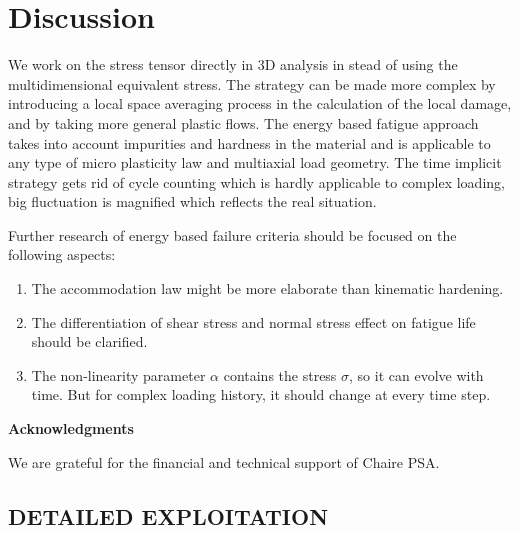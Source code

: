 \documentclass[3p,times,number,review]{elsarticle}
\begin{document}
\clearpage
\section{Discussion}
We work on the stress tensor directly in 3D analysis in stead of using the multidimensional equivalent stress.
The strategy can be made more complex by introducing a local space averaging process in the calculation of the local damage, and by taking more general plastic flows. The energy based fatigue approach takes into account impurities and hardness in the material and is applicable to any type of micro plasticity law and multiaxial load geometry. The time implicit strategy gets rid of cycle counting which is hardly applicable to complex loading, big fluctuation is magnified which reflects the real situation.

Further research of energy based failure criteria should be focused on the following aspects:
\begin{enumerate}
\item The accommodation law might be more elaborate than kinematic hardening.

\vspace{6pt}
\item The differentiation of shear stress and normal stress effect on fatigue life should be clarified.

\vspace{6pt}
\item The non-linearity parameter $\alpha$ contains the stress $\sigma$, so it can evolve with time. But for complex loading history, it should change at every time step.

\end{enumerate}

\vspace{6pt}
\noindent
\textbf{Acknowledgments}

\vspace{6pt}
We are grateful for the financial and technical support of Chaire PSA.




\clearpage
\appendix
\appendixpage
{}
\begin{subappendices}
	\section{DETAILED EXPLOITATION}
	
    
   	    
%    	
%   	
\end{subappendices}
\end{document}
